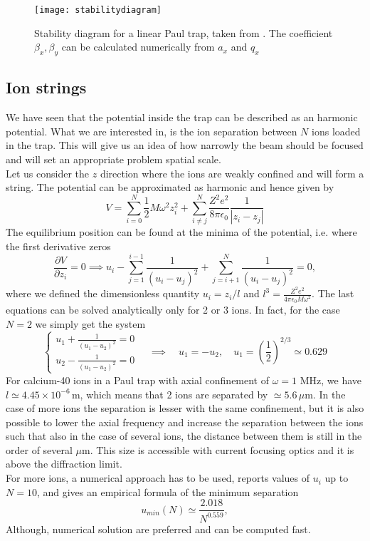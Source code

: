 \begin{figure}[H]
\centering
\texttt{[image: stabilitydiagram]}
\caption{Stability diagram for a linear Paul trap, taken from \cite{iondynamic}. The coefficient $\beta_x,\beta_y$ can be calculated numerically from $a_x$ and $q_x$}
\label{stabilitydiagram}
\end{figure}


\subsection{Ion strings}
\label{ionstrings}
We have seen that the potential inside the trap can be described as an harmonic potential. What we are interested in, is the ion separation between $N$ ions loaded in the trap. This will give us an idea of how narrowly the beam should be focused and will set an appropriate problem spatial scale.\\
Let us consider the $z$ direction where the ions are weakly confined and will form a string. The potential can be approximated as harmonic and hence given by
\begin{equation}
V = \sum_{i=0}^N \frac{1}{2}M\omega^2z_i^2 + \sum_{i\neq j}^N\frac{Z^2e^2}{8\pi \epsilon_0}\frac{1}{|z_i-z_j|}
\end{equation}
The equilibrium position can be found at the minima of the potential, i.e. where the first derivative zeros
\begin{equation}
\frac{\partial V}{\partial z_i} = 0 \implies u_i - \sum_{j=1}^{i-1} \frac{1}{(u_i-u_j)^2} + \sum_{j= i+1}^{N} \frac{1}{(u_i-u_j)^2}= 0,
\end{equation}
where we defined the dimensionless quantity $u_i = z_i/l$ and $l^3 = \displaystyle\frac{Z^2 e^2 }{4\pi \epsilon_0 M\omega^2}$.
The last equations can be solved analytically only for 2 or 3 ions. In fact, for the case $N=2$ we simply get the system
\begin{equation}
\begin{cases}
  u_1 + \frac{1}{(u_1-u_2)^2} = 0\\
  u_2 - \frac{1}{(u_1-u_2)^2} = 0
  \end{cases} \quad \implies \quad u_1 = -u_2,\quad  u_1 = \left(\frac{1}{2}\right)^{2/3} \simeq 0.629
\end{equation}
For calcium-40 ions in a Paul trap with axial confinement of $\omega = 1$ MHz, we have $l \simeq 4.45\times 10^{-6}\,$m, which means that 2 ions are separated by $\simeq 5.6\, \mu$m. In the case of more ions the separation is lesser with the same confinement, but it is also possible to lower the axial frequency and increase the separation between the ions such that also in the case of several ions, the distance between them is still in the order of several $\mu$m. This size is accessible with current focusing optics and it is above the diffraction limit.\\
For more ions, a numerical approach has to be used, \cite{ion_spacing} reports values of $u_i$ up to $N=10$, and gives an empirical formula of the minimum separation
\begin{equation}
u_{min}(N) \simeq \frac{2.018}{N^{0.559}},
\end{equation}
Although, numerical solution are preferred and can be computed fast.
